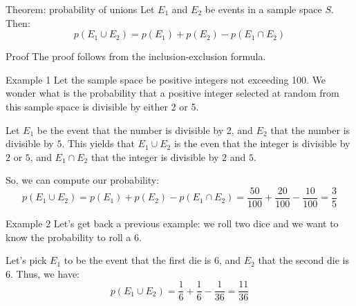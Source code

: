 \documentclass[a4paper]{article}
\begin{document}
\begin{parag}{Theorem: probability of unions}
    Let $E_1$ and $E_2$ be events in a sample space $S$. Then: 
    \[p\left(E_1 \cup E_2\right) = p\left(E_1\right) + p\left(E_2\right) - p\left(E_1 \cap E_2\right)\]

    \begin{subparag}{Proof}
        The proof follows from the inclusion-exclusion formula.
    \end{subparag}
\end{parag}

\begin{parag}{Example 1}
    Let the sample space be positive integers not exceeding 100. We wonder what is the probability that a positive integer selected at random from this sample space is divisible by either 2 or 5.

    Let $E_1$ be the event that the number is divisible by 2, and $E_2$ that the number is divisible by $5$. This yields that $E_1 \cup E_2$ is the even that the integer is divisible by $2$ or $5$, and $E_1 \cap E_2$ that the integer is divisible by $2$ and $5$.

    So, we can compute our probability: 
    \[p\left(E_1 \cup E_2\right) = p\left(E_1\right) + p\left(E_2\right) - p\left(E_1 \cap E_2\right) = \frac{50}{100} + \frac{20}{100} - \frac{10}{100} = \frac{3}{5}\]
\end{parag}

\begin{parag}{Example 2}
    Let's get back a previous example: we roll two dice and we want to know the probability to roll a 6.

    Let's pick $E_1$ to be the event that the first die is 6, and $E_2$ that the second die is 6. Thus, we have: 
    \[p\left(E_1 \cup E_2\right) = \frac{1}{6} + \frac{1}{6} - \frac{1}{36} = \frac{11}{36}\]
\end{parag}
\end{document}

